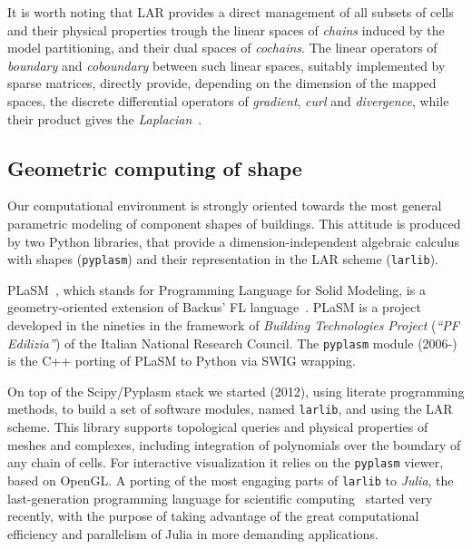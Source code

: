 It is worth noting that LAR provides a direct management of all subsets of cells and their physical properties trough the linear spaces of \emph{chains} induced by the model partitioning, and their dual spaces of \emph{cochains}. The linear operators of \emph{boundary} and \emph{coboundary} between such linear spaces, suitably implemented by sparse matrices, directly provide, depending on the dimension of the mapped spaces, the discrete differential operators of \emph{gradient}, \emph{curl} and \emph{divergence}, while their product gives the \emph{Laplacian}~\cite{ieee-tase}.  

\vspace{-3mm}\subsection{Geometric computing of shape}\vspace{-3mm}

Our computational environment is strongly oriented towards the most general parametric modeling of component shapes of buildings. This attitude is produced by two Python libraries, that provide a dimension-independent algebraic calculus with shapes (\texttt{pyplasm}) and their representation in the LAR scheme (\texttt{larlib}). 

PLaSM~\cite{Paoluzzi:1995:GPP:212332.212349,Paoluzzi:2001:GPC:600092}, which stands for Programming Language for Solid Modeling, is a geometry-oriented extension of Backus' FL language~\cite{backus:78,BWWLA89}.  PLaSM is a project developed in the nineties in the framework of \emph{Building Technologies Project} (\emph{``PF Edilizia''}) of the Italian National Research Council. The \texttt{pyplasm} module (2006-) is the C++ porting of PLaSM to Python via SWIG wrapping.

On top of the Scipy/Pyplasm stack we started (2012), using literate programming methods, to build a set of software modules, named \texttt{larlib}, and using the LAR scheme. This library supports  topological queries and physical properties of meshes and complexes, including integration of polynomials over the boundary of any chain of cells. For interactive visualization it relies on the \texttt{pyplasm} viewer, based on OpenGL.
A porting of the most engaging parts of \texttt{larlib} to \emph{Julia}, the last-generation programming language  for scientific computing~\cite{BEKS14} started very recently, with the purpose of taking advantage of the great computational efficiency and parallelism of Julia in more demanding applications. 


